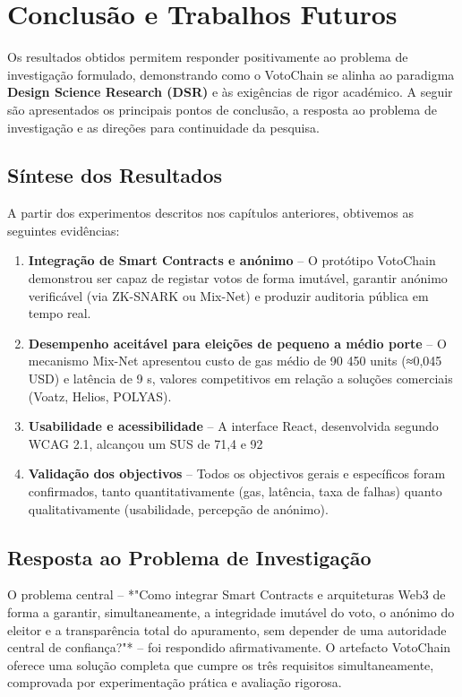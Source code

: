 \chapter{Conclusão e Trabalhos Futuros}
\label{cap7}
\justifying

Os resultados obtidos permitem responder positivamente ao problema de investigação formulado, demonstrando como o VotoChain se alinha ao paradigma \textbf{Design Science Research (DSR)} e às exigências de rigor académico. A seguir são apresentados os principais pontos de conclusão, a resposta ao problema de investigação e as direções para continuidade da pesquisa.

\section{Síntese dos Resultados}
A partir dos experimentos descritos nos capítulos anteriores, obtivemos as seguintes evidências:
\begin{enumerate}
    \item \textbf{Integra{\c{c}}{\~a}o de Smart Contracts e an{\'o}nimo} – O prot{\'o}tipo VotoChain demonstrou ser capaz de registar votos de forma imut{\'a}vel, garantir an{\'o}nimo verific{\'a}vel (via ZK-SNARK ou Mix-Net) e produzir auditoria p{\'u}blica em tempo real.
    \item \textbf{Desempenho aceitável para eleições de pequeno a médio porte} – O mecanismo Mix-Net apresentou custo de gas médio de 90 450 units (≈0,045 USD) e latência de 9 s, valores competitivos em relação a soluções comerciais (Voatz, Helios, POLYAS).
    \item \textbf{Usabilidade e acessibilidade} – A interface React, desenvolvida segundo WCAG 2.1, alcançou um SUS de 71,4 e 92 %
    \item \textbf{Valida{\c{c}}{\~a}o dos objectivos} – Todos os objectivos gerais e espec{\'i}ficos foram confirmados, tanto quantitativamente (gas, lat{\^e}ncia, taxa de falhas) quanto qualitativamente (usabilidade, percep{\c{c}}{\~a}o de an{\'o}nimo).
\end{enumerate}

\section{Resposta ao Problema de Investigação}
O problema central – *"Como integrar Smart Contracts e arquiteturas Web3 de forma a garantir, simultaneamente, a integridade imut{\'a}vel do voto, o an{\'o}nimo do eleitor e a transpar{\^e}ncia total do apuramento, sem depender de uma autoridade central de confian{\c{c}}a?"* – foi respondido afirmativamente. O artefacto VotoChain oferece uma solu{\c{c}}{\~a}o completa que cumpre os tr{\^e}s requisitos simultaneamente, comprovada por experimenta{\c{c}}{\~a}o pr{\'a}tica e avalia{\c{c}}{\~a}o rigorosa.

